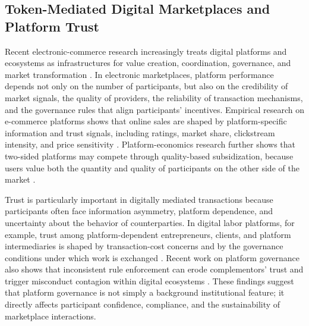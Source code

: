 \documentclass[a4paper,fleqn]{cas-dc}
\begin{document}
\subsection{Token-Mediated Digital Marketplaces and Platform Trust}

Recent electronic-commerce research increasingly treats digital platforms and ecosystems as infrastructures for value creation, coordination, governance, and market transformation \citep{cuel2024transformation,kari2025networkgovernance}. In electronic marketplaces, platform performance depends not only on the number of participants, but also on the credibility of market signals, the quality of providers, the reliability of transaction mechanisms, and the governance rules that align participants' incentives. Empirical research on e-commerce platforms shows that online sales are shaped by platform-specific information and trust signals, including ratings, market share, clickstream intensity, and price sensitivity \citep{dai2022onlineplatforms}. Platform-economics research further shows that two-sided platforms may compete through quality-based subsidization, because users value both the quantity and quality of participants on the other side of the market \citep{fu2022qualitysubsidization}.

Trust is particularly important in digitally mediated transactions because participants often face information asymmetry, platform dependence, and uncertainty about the behavior of counterparties. In digital labor platforms, for example, trust among platform-dependent entrepreneurs, clients, and platform intermediaries is shaped by transaction-cost concerns and by the governance conditions under which work is exchanged \citep{yao2022platformtrust}. Recent work on platform governance also shows that inconsistent rule enforcement can erode complementors' trust and trigger misconduct contagion within digital ecosystems \citep{gawer2025inconsistentgovernance}. These findings suggest that platform governance is not simply a background institutional feature; it directly affects participant confidence, compliance, and the sustainability of marketplace interactions. 
\end{document}
